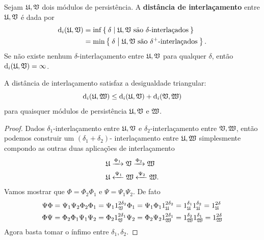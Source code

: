 \begin{defi}
    Sejam $\mathfrak{U}, \mathfrak{V}$ dois módulos de persistência. A \textbf{distância
    de interlaçamento} entre $\mathfrak{U}, \mathfrak{V}$ é dada por
    \begin{align*}
        \text{d}_i(\mathfrak{U}, \mathfrak{V}) &= \inf\Set{\delta | \mathfrak{U}, \mathfrak{V}\text{ são }
        \delta \text{-interlaçados}} \\
        &=\min\Set{\delta | \mathfrak{U}, \mathfrak{V}\text{ são } \delta^+ 
        \text{-interlaçados}}.
    \end{align*}
    Se não existe nenhum $\delta$-interlaçamento entre $\mathfrak{U}, \mathfrak{V}$ para
    qualquer $\delta$, então $\text{d}_i(\mathfrak{U}, \mathfrak{V}) = \infty$.
\end{defi}

\begin{propo}\label{teo:inter_triang}
    A distância de interlaçamento satisfaz a desigualdade triangular:
    \begin{equation*}
        \text{d}_i(\mathfrak{U}, \mathfrak{W}) \leq \text{d}_i(\mathfrak{U}, \mathfrak{V}) + \text{d}_i(\mathfrak{V}, \mathfrak{W})
    \end{equation*}
    para quaisquer módulos de persistência $\mathfrak{U}, \mathfrak{V}$ e $\mathfrak{W}$. 
\end{propo}
\begin{proof}
    Dados $\delta_1$-interlaçamento entre $\mathfrak{U}, \mathfrak{V}$ e $\delta_2$-interlaçamento
    entre $\mathfrak{V}, \mathfrak{W}$, então podemos construir um $(\delta_1 + \delta_2)$-
    interlaçamento entre $\mathfrak{U}, \mathfrak{W}$ simplesmente compondo as outras duas aplicações
    de interlaçamento
    \begin{align*}
        &\mathfrak{U} \xrightarrow{\Phi_1} \mathfrak{V} \xrightarrow{\Phi_2} \mathfrak{W} \\
        &\mathfrak{U} \xleftarrow{\Psi_1} \mathfrak{W} \xleftarrow{\Psi_2} \mathfrak{W}.
    \end{align*}
    Vamos mostrar que $\Phi = \Phi_2 \Phi_1$ e $\Psi = \Psi_1 \Psi_2$. De fato
    \begin{align*}
        & \Psi\Phi = \Psi_1\Psi_2\Phi_2\Phi_1 = \Psi_1 1^{2\delta_2}_{\mathfrak{V}} \Phi_1 
        = \Psi_1\Phi_1 1^{2\delta_2}_{\mathfrak{U}} = 1^{\delta_1}_{\mathfrak{U}} 1^{\delta_2}_{\mathfrak{U}}
        = 1^{2\delta}_{\mathfrak{U}} \\
        & \Phi\Psi = \Phi_2\Phi_1\Psi_1\Psi_2 = \Phi_2 1^{2\delta_1}_{\mathfrak{V}} \Psi_2 
        = \Phi_2\Psi_2 1^{2\delta_1}_{\mathfrak{W}} = 1^{\delta_2}_{\mathfrak{W}} 1^{\delta_1}_{\mathfrak{W}}
        = 1^{2\delta}_{\mathfrak{W}} 
    \end{align*}
    Agora basta tomar o ínfimo entre $\delta_1, \delta_2$.
\end{proof}

